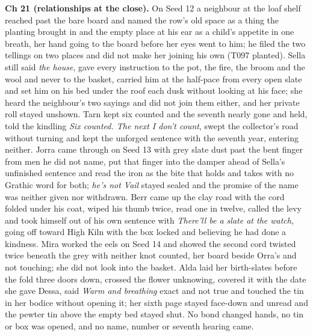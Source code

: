 \documentclass{design/chronicle}
\begin{document}
{\textbf{Ch 21 (relationships at the close).} On Seed 12 a neighbour at the loaf shelf reached past the bare board and named the row’s old space as a thing the planting brought in and the empty place at his ear as a child’s appetite in one breath, her hand going to the board before her eyes went to him; he filed the two tellings on two places and did not make her joining his own (T097 planted). Sella still said \emph{the house}, gave every instruction to the pot, the fire, the broom and the wool and never to the basket, carried him at the half-pace from every open slate and set him on his bed under the roof each dusk without looking at his face; she heard the neighbour’s two sayings and did not join them either, and her private roll stayed unshown. Tarn kept six counted and the seventh nearly gone and held, told the kindling \emph{Six counted. The next I don’t count}, swept the collector’s road without turning and kept the unforged sentence with the seventh year, entering neither. Jorra came through on Seed 13 with grey slate dust past the bent finger from men he did not name, put that finger into the damper ahead of Sella’s unfinished sentence and read the iron as the bite that holds and takes with no Grathic word for both; \emph{he’s not Vail} stayed sealed and the promise of the name was neither given nor withdrawn. Berr came up the clay road with the cord folded under his coat, wiped his thumb twice, read one in twelve, called the levy and took himself out of his own sentence with \emph{There’ll be a slate at the watch}, going off toward High Kiln with the box locked and believing he had done a kindness. Mira worked the eels on Seed 14 and showed the second cord twisted twice beneath the grey with neither knot counted, her board beside Orra’s and not touching; she did not look into the basket. Alda laid her birth-slates before the fold three doors down, crossed the flower unknowing, covered it with the date she gave Dessa, said \emph{Warm and breathing} exact and not true and touched the tin in her bodice without opening it; her sixth page stayed face-down and unread and the pewter tin above the empty bed stayed shut. No bond changed hands, no tin or box was opened, and no name, number or seventh hearing came.

}
\end{document}
